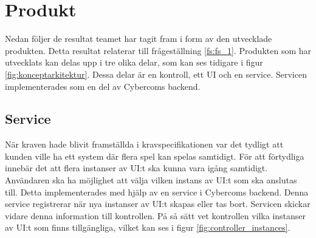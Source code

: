 \section{Produkt}
\label{sec:produkt}
Nedan följer de resultat teamet har tagit fram i form av den utvecklade produkten. Detta resultat relaterar till frågeställning \ref{fs:fs_1}. Produkten som har utvecklats kan delas upp i tre olika delar, som kan ses tidigare i figur \ref{fig:konceptarkitektur}. Dessa delar är en kontroll, ett UI och en service. Servicen implementerades som en del av Cybercoms backend.

\subsection{Service}
När kraven hade blivit framställda i kravspecifikationen var det tydligt att kunden ville ha ett system där flera spel kan spelas samtidigt. För att förtydliga innebär det att flera instanser av UI:t ska kunna vara igång samtidigt. Användaren ska ha möjlighet att välja vilken instans av UI:t som ska anslutas till. Detta implementerades med hjälp av en service i Cybercoms backend. Denna service registrerar när nya instanser av UI:t skapas eller tas bort. Servicen skickar vidare denna information till kontrollen. På så sätt vet kontrollen vilka instanser av UI:t som finns tillgängliga, vilket kan ses i figur \ref{fig:controller_instances}.

